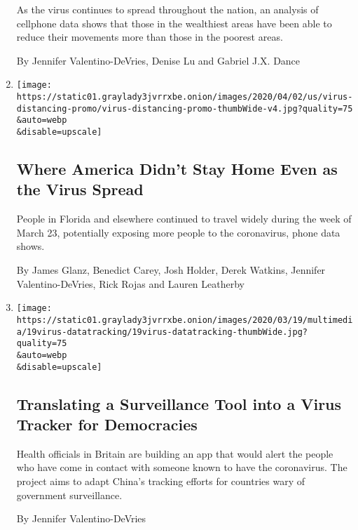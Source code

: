 \begin{enumerate}
  As the virus continues to spread throughout the nation, an analysis of
  cellphone data shows that those in the wealthiest areas have been able
  to reduce their movements more than those in the poorest areas.

  By Jennifer Valentino-DeVries, Denise Lu and Gabriel J.X. Dance
\item
  \href{/interactive/2020/04/02/us/coronavirus-social-distancing.html}{}

  \texttt{[image: https://static01.graylady3jvrrxbe.onion/images/2020/04/02/us/virus-distancing-promo/virus-distancing-promo-thumbWide-v4.jpg?quality=75\\\&auto=webp\\\&disable=upscale]}

  \hypertarget{where-america-didnt-stay-home-even-as-the-virus-spread}{%
  \subsection{Where America Didn't Stay Home Even as the Virus
  Spread}\label{where-america-didnt-stay-home-even-as-the-virus-spread}}

  People in Florida and elsewhere continued to travel widely during the
  week of March 23, potentially exposing more people to the coronavirus,
  phone data shows.

  By James Glanz, Benedict Carey, Josh Holder, Derek Watkins, Jennifer
  Valentino-DeVries, Rick Rojas and Lauren Leatherby
\item
  \href{/2020/03/19/us/coronavirus-location-tracking.html}{}

  \texttt{[image: https://static01.graylady3jvrrxbe.onion/images/2020/03/19/multimedia/19virus-datatracking/19virus-datatracking-thumbWide.jpg?quality=75\\\&auto=webp\\\&disable=upscale]}

  \hypertarget{translating-a-surveillance-tool-into-a-virus-tracker-for-democracies}{%
  \subsection{Translating a Surveillance Tool into a Virus Tracker for
  Democracies}\label{translating-a-surveillance-tool-into-a-virus-tracker-for-democracies}}

  Health officials in Britain are building an app that would alert the
  people who have come in contact with someone known to have the
  coronavirus. The project aims to adapt China's tracking efforts for
  countries wary of government surveillance.

  By Jennifer Valentino-DeVries


\end{enumerate}
